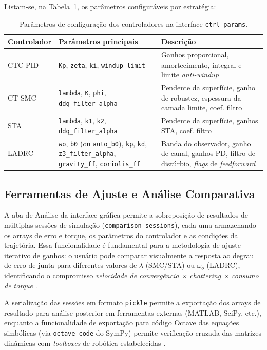 Listam-se, na Tabela~\ref{tab:ctrl_params}, os parâmetros configuráveis por estratégia:

\begin{table}[h!]
\centering
\caption{Parâmetros de configuração dos controladores na interface \texttt{ctrl\_params}.}
\label{tab:ctrl_params}
\begin{tabular}{p{2.5cm} p{3.8cm} p{6.5cm}}
\hline
\textbf{Controlador} & \textbf{Parâmetros principais} & \textbf{Descrição} \\
\hline
CTC-PID & \texttt{Kp}, \texttt{zeta}, \texttt{ki}, \texttt{windup\_limit} & Ganhos proporcional, amortecimento, integral e limite \textit{anti-windup} \\
CT-SMC & \texttt{lambda}, \texttt{K}, \texttt{phi}, \texttt{ddq\_filter\_alpha} & Pendente da superfície, ganho de robustez, espessura da camada limite, coef. filtro \\
STA & \texttt{lambda}, \texttt{k1}, \texttt{k2}, \texttt{ddq\_filter\_alpha} & Pendente da superfície, ganhos STA, coef. filtro \\
LADRC & \texttt{wo}, \texttt{b0} (ou \texttt{auto\_b0}), \texttt{kp}, \texttt{kd}, \texttt{z3\_filter\_alpha}, \texttt{gravity\_ff}, \texttt{coriolis\_ff} & Banda do observador, ganho de canal, ganhos PD, filtro de distúrbio, \textit{flags} de \textit{feedforward} \\
\hline
\end{tabular}
\end{table}

\subsection{Ferramentas de Ajuste e Análise Comparativa}

A aba de Análise da interface gráfica permite a sobreposição de resultados de múltiplas sessões de simulação (\texttt{comparison\_sessions}), cada uma armazenando os arrays de erro e torque, os parâmetros do controlador e as condições da trajetória. Essa funcionalidade é fundamental para a metodologia de ajuste iterativo de ganhos: o usuário pode comparar visualmente a resposta ao degrau de erro de junta para diferentes valores de $\lambda$ (SMC/STA) ou $\omega_o$ (LADRC), identificando o compromisso \textit{velocidade de convergência × chattering × consumo de torque} \cite{astrom1995theory, han2009pid}.

A serialização das sessões em formato \texttt{pickle} permite a exportação dos arrays de resultado para análise posterior em ferramentas externas (MATLAB, SciPy, etc.), enquanto a funcionalidade de exportação para código Octave das equações simbólicas (via \texttt{octave\_code} do SymPy) permite verificação cruzada das matrizes dinâmicas com \textit{toolboxes} de robótica estabelecidas \cite{spong2020robot, corke2017robotics}.

